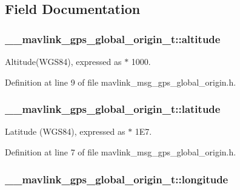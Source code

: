 \subsection{Field Documentation}
\hypertarget{struct____mavlink__gps__global__origin__t_a34577699f6c0ef2517eb8b16da733c15}{
\subsubsection[{altitude}]{ \-\_\-\-\_\-mavlink\-\_\-gps\-\_\-global\-\_\-origin\-\_\-t\-::altitude}}\label{struct____mavlink__gps__global__origin__t_a34577699f6c0ef2517eb8b16da733c15}


Altitude(\-W\-G\-S84), expressed as $\ast$ 1000. 



Definition at line 9 of file mavlink\-\_\-msg\-\_\-gps\-\_\-global\-\_\-origin.\-h.

\hypertarget{struct____mavlink__gps__global__origin__t_ab78807fb15062419bf5452c3294235bc}{
\subsubsection[{latitude}]{ \-\_\-\-\_\-mavlink\-\_\-gps\-\_\-global\-\_\-origin\-\_\-t\-::latitude}}\label{struct____mavlink__gps__global__origin__t_ab78807fb15062419bf5452c3294235bc}


Latitude (W\-G\-S84), expressed as $\ast$ 1\-E7. 



Definition at line 7 of file mavlink\-\_\-msg\-\_\-gps\-\_\-global\-\_\-origin.\-h.

\hypertarget{struct____mavlink__gps__global__origin__t_a52156dc446e0be0bc5cbf4247e194349}{
\subsubsection[{longitude}]{ \-\_\-\-\_\-mavlink\-\_\-gps\-\_\-global\-\_\-origin\-\_\-t\-::longitude}}\label{struct____mavlink__gps__global__origin__t_a52156dc446e0be0bc5cbf4247e194349}


